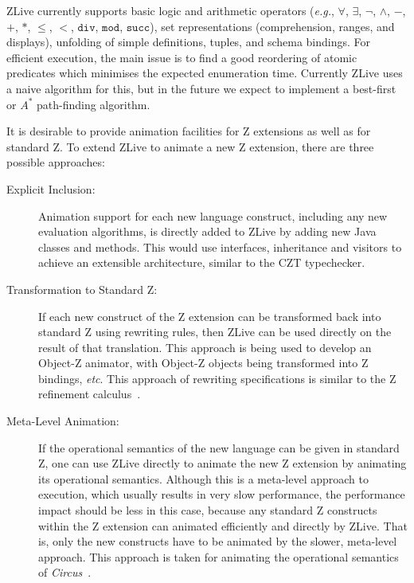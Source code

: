 \documentclass{llncs}
\newcommand{\Circus}{{\sf\slshape Circus}}
\begin{document}
    ZLive currently supports basic logic and arithmetic operators
    (\textit{e.g.}, $\forall$, $\exists$, $\lnot$, $\land$, $-$,
    $+$, $*$, $\leq$, $<$, $\mathtt{div}$, $\mathtt{mod}$, $\mathtt{succ}$),
    set representations (comprehension, ranges, and displays), unfolding
    of simple definitions, tuples, and schema bindings.
    For efficient execution, the main issue is to find a good reordering
    of atomic predicates which minimises the expected enumeration time.
    Currently ZLive uses a naive algorithm for this, but in the future we
    expect to implement a best-first or $A^{*}$ path-finding algorithm.

    It is desirable to provide animation facilities for Z extensions
    as well as for standard Z.  To extend ZLive to animate a new Z
    extension, there are three possible approaches:
    \begin{description}

      \item[Explicit Inclusion:] Animation support for each new
      language construct, including any new evaluation algorithms, is
      directly added to ZLive by add\-ing new Java
      classes and methods.  This would use interfaces, inheritance
      and visitors to achieve an extensible architecture, similar to
      the CZT typechecker.

      \item[Transformation to Standard Z:] If each new construct of
      the Z extension can be transformed back into standard Z
      using rewriting rules, then ZLive can be used directly
      on the result of that translation.
      This approach is being used to develop an Object-Z
      animator, with Object-Z objects being
      transformed into Z bindings, \textit{etc}.  This approach of
      rewriting specifications is similar to the Z refinement
      calculus~\cite{z.others:ana.phd,fm.ref:morgan}.

      \item[Meta-Level Animation:] If the operational semantics of
      the new language can be given in standard Z, one can use ZLive
      directly to animate the new Z extension by animating its
      operational semantics.  Although this is a meta-level
      approach to execution, which usually results in very slow
      performance, the performance impact should be less in this case,
      because any standard Z constructs within the Z extension can
      animated efficiently and directly by ZLive.  That is, only the
      new constructs have to be animated by the slower, meta-level
      approach.  This approach is taken for animating the operational
      semantics of \Circus~\cite{circus.mc:opsem}.

    \end{description}
\end{document}
